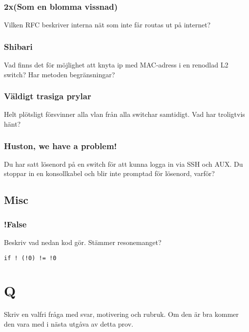 \documentclass[a4paper]{report}
\begin{document}
\subsubsection{2x(Som en blomma vissnad)}
Vilken RFC beskriver interna nät som inte får routas ut på internet?

\subsubsection{Shibari}
Vad finns det för möjlighet att knyta ip med MAC-adress i en renodlad L2 switch? Har metoden begränsningar?

\subsubsection{Väldigt trasiga prylar}
Helt plötsligt försvinner alla vlan från alla switchar samtidigt. Vad har troligtvis hänt?

\subsubsection{Huston, we have a problem!}
Du har satt lösenord på en switch för att kunna logga in via SSH och AUX.
Du stoppar in en konsollkabel och blir inte promptad för lösenord, varför?

\subsection{Misc}
\subsubsection{!False}
Beskriv vad nedan kod gör. Stämmer resonemanget?
\begin{verbatim}
if ! (!0) != !0
\end{verbatim}

\section{Q}
Skriv en valfri fråga med svar, motivering och rubruk. Om den är bra kommer den vara med i nästa utgåva av detta prov.
\end{document}
